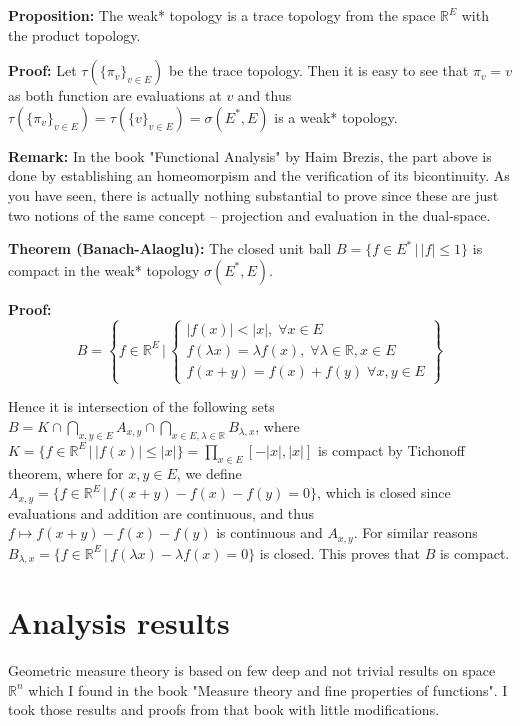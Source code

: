\documentclass{article}
\begin{document}
\vspace{1ex}
\textbf{Proposition:} The weak* topology is a trace topology from the space
$\mathbb{R}^E$ with the product topology.

\vspace{1ex}
\textbf{Proof:} Let $\tau(\{\pi_v\}_{v\in E})$ be the trace topology. Then it
is easy to see that $\pi_v=v$ as both function are evaluations at $v$ and thus
$\tau(\{\pi_v\}_{v\in E})=\tau(\{v\}_{v\in E})=\sigma(E^*, E)$ is a weak*
topology.

\vspace{1ex}
\textbf{Remark:} In the book "Functional Analysis" by Haim Brezis, the part
above is done by establishing an homeomorpism and the verification of its bicontinuity.
As you have seen, there is actually nothing substantial to prove since these are 
just two notions of the same concept – projection and evaluation in the dual-space.

\vspace{1ex}
\textbf{Theorem (Banach-Alaoglu):} The closed unit ball $B=\{f\in E^*\,|\,|
f|\leq 1\}$ is compact in the weak* topology $\sigma(E^*, E)$.

\vspace{1ex}
\textbf{Proof:}
\[ B=\left\{f\in\mathbb{R}^E\,|\,
\begin{cases}
    |f(x)|<|x|,\;\forall x\in E\\
    f(\lambda x)=\lambda f(x),\;\forall\lambda\in\mathbb{R}, x\in E\\
    f(x+y)=f(x)+f(y)\;\forall x,y\in E
\end{cases}
\right\} \] 

Hence it is intersection of the following sets $B=K\cap\bigcap_{x,y\in E} A_{x,y}
\cap\bigcap_{x\in E, \lambda\in\mathbb{R}}B_{\lambda,x}$, where $K=\{f\in\mathbb
{R}^E\,|\,|f(x)|\leq|x|\}=\prod_{x\in E}[-|x|, |x|]$ is compact by Tichonoff
theorem, where for $x,y\in E$, we define $A_{x,y}=\{f\in\mathbb{R}^E\,|\,f(x+y)-
f(x)-f(y)=0\}$, which is closed since evaluations and addition are continuous, and
thus $f\mapsto f(x+y)-f(x)-f(y)$ is continuous and $A_{x,y}$. For similar
reasons $B_{\lambda, x}=\{f\in\mathbb{R}^E\,|\,f(\lambda x)-\lambda f(x)=0\}$ is
closed. This proves that $B$ is compact.

\section{Analysis results}

Geometric measure theory is based on few deep and not trivial results on space
$\mathbb{R}^n$ which I found in the book "Measure theory and fine properties
of functions". I took those results and proofs from that book with little
modifications.
\end{document}
